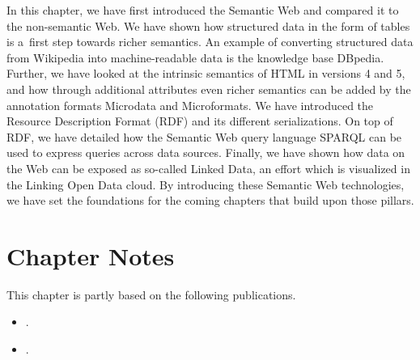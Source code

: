 In this chapter, we have first introduced the Semantic Web
and compared it to the non-semantic Web.
We have shown how structured data in the form of tables
is a~first step towards richer semantics.
An example of converting structured data from Wikipedia
into machine-readable data is the knowledge base DBpedia.
Further, we have looked at the intrinsic semantics
of HTML in versions 4 and 5,
and how through additional attributes
even richer semantics can be added
by the annotation formats Microdata and Microformats.
We have introduced the Resource Description Format (RDF)
and its different serializations.
On top of RDF, we have detailed
how the Semantic Web query language SPARQL
can be used to express queries across data sources.
Finally, we have shown how data on the Web
can be exposed as so-called Linked Data,
an effort which is visualized in the Linking Open Data cloud.
By introducing these Semantic Web technologies,
we have set the foundations for the coming chapters
that build upon those pillars.

\section*{Chapter Notes}
This chapter is partly based on the following publications.

\begin{itemize}
  \item {}.
  \item {}.
\end{itemize}

\clearpage
\printbibliography[heading=subbibliography]